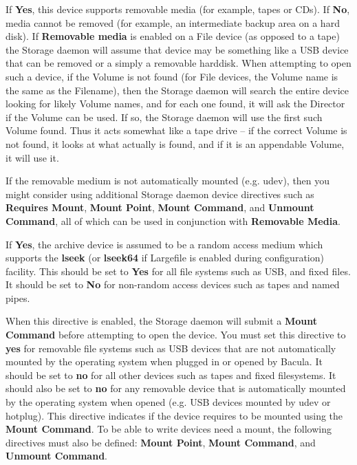 \begin{description}
\label{removablemedia}
\item [Removable media = {\it yes\vb{}no}]
   If {\bf Yes}, this device supports removable media (for example, tapes
   or CDs).  If {\bf No}, media cannot be removed (for example, an
   intermediate backup area on a hard disk). If {\bf Removable media} is
   enabled on a File device (as opposed to a tape) the Storage daemon will
   assume that device may be something like a USB device that can be
   removed or a simply a removable harddisk. When attempting to open
   such a device, if the Volume is not found (for File devices, the Volume
   name is the same as the Filename), then the Storage daemon will search
   the entire device looking for likely Volume names, and for each one 
   found, it will ask the Director if the Volume can be used.  If so,
   the Storage daemon will use the first such Volume found.  Thus it
   acts somewhat like a tape drive -- if the correct Volume is not found,
   it looks at what actually is found, and if it is an appendable Volume,
   it will use it.

   If the removable medium is not automatically mounted (e.g. udev), then
   you might consider using additional Storage daemon device directives
   such as {\bf Requires Mount}, {\bf Mount Point}, {\bf Mount Command},
   and {\bf Unmount Command}, all of which can be used in conjunction with
   {\bf Removable Media}.    


\item [Random access = {\it yes\vb{}no}]
   If {\bf Yes}, the archive device is assumed to be a random access medium
   which supports the {\bf lseek} (or {\bf lseek64} if Largefile is enabled
   during configuration) facility. This should be set to {\bf Yes} for all
   file systems such as USB, and fixed files.  It should be set to
   {\bf No} for non-random access devices such as tapes and named pipes.


\item [Requires Mount = {\it yes\vb{}no}]
   When this directive is enabled, the Storage daemon will submit
   a {\bf Mount Command} before attempting to open the device.
   You must set this directive to {\bf yes} for removable
   file systems such as USB devices that are not automatically mounted
   by the operating system when plugged in or opened by Bacula.
   It should be set to {\bf no} for
   all other devices such as tapes and fixed filesystems. It should also
   be set to {\bf no} for any removable device that is automatically
   mounted by the operating system when opened (e.g. USB devices mounted
   by udev or hotplug). This directive
   indicates if the device requires to be mounted using the {\bf Mount
   Command}.  To be able to write devices need a mount, the following
   directives must also be defined: {\bf Mount Point}, {\bf Mount Command},
   and {\bf Unmount Command}.


\end{description}
